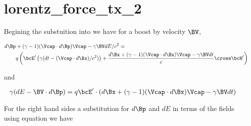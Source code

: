 %
%
%
%
%
%
%
%
\chapter{lorentz_force_tx_2}

Begining the substuition into  we have for a boost by velocity \(\BV\),

\begin{equation}\label{eqn:lorentz_force_tx_2:20}
\begin{aligned}
d\Bp &+ (\gamma-1)(\Vcap \cdot d\Bp) \Vcap - \gamma \BV dE/c^2 = \\
&q \left( \bcE' \left(\gamma ( dt - (\Vcap \cdot d\Bx )/c^2 )\right) + \frac{d\Bx + (\gamma-1)(\Vcap \cdot d\Bx) \Vcap - \gamma \BV dt}{c} \cross \bcH' \right)  \\
\end{aligned}
\end{equation}

and

\begin{equation}\label{eqn:lorentz_force_tx_2:40}
\begin{aligned}
\gamma ( dE - \BV \cdot d\Bp ) &= q \bcE' \cdot \left(d\Bx + (\gamma-1)(\Vcap \cdot d\Bx) \Vcap - \gamma \BV dt\right)
\end{aligned}
\end{equation}

For the right hand sides a substitution for \(d\Bp\) and \(dE\) in terms of the fields using equation
 we have


